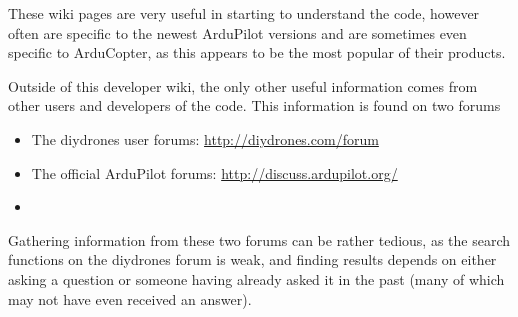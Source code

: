 These wiki pages are very useful in starting to understand the code, however often are specific to the newest ArduPilot versions and are sometimes even specific to ArduCopter, as this appears to be the most popular of their products. 

Outside of this developer wiki, the only other useful information comes from other users and developers of the code. This information is found on two forums

\begin{itemize}
	\item The diydrones user forums: \url{http://diydrones.com/forum}
	\item The official ArduPilot forums: \url{http://discuss.ardupilot.org/}
	\item 	
\end{itemize}

Gathering information from these two forums can be rather tedious, as the search functions on the diydrones forum is weak, and finding results depends on either asking a question or someone having already asked it in the past (many of which may not have even received an answer). 


